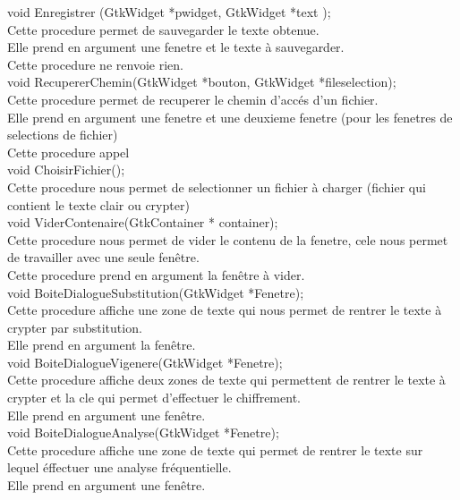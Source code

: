 \documentclass[a4]{article}
\begin{document}
	void Enregistrer (GtkWidget *pwidget, GtkWidget *text );\\
		Cette procedure permet de sauvegarder le texte obtenue.\\
		Elle prend en argument une fenetre et le texte à sauvegarder.\\
		Cette procedure ne renvoie rien.\\
	
	void RecupererChemin(GtkWidget *bouton, GtkWidget *fileselection);\\
		Cette procedure permet de recuperer le chemin d'accés d'un fichier.\\
		Elle prend en argument une fenetre et une deuxieme fenetre (pour les fenetres de selections de fichier)\\
		Cette procedure appel\\

	void ChoisirFichier();\\
		Cette procedure nous permet de selectionner un fichier à charger (fichier qui contient le texte clair ou crypter)\\

	void ViderContenaire(GtkContainer * container);\\
		Cette procedure nous permet de vider le contenu de la fenetre, cele nous permet de travailler avec une seule fenêtre.\\
		Cette procedure prend en argument la fenêtre à vider.\\
		
	void BoiteDialogueSubstitution(GtkWidget *Fenetre);\\
		Cette procedure affiche une zone de texte qui nous permet de rentrer le texte à crypter par substitution.\\
		Elle prend en argument la fenêtre.\\
	
	void BoiteDialogueVigenere(GtkWidget *Fenetre);\\
		Cette procedure affiche deux zones de texte qui permettent de rentrer le texte à crypter et la cle qui permet d'effectuer le chiffrement.\\
		Elle prend en argument une fenêtre.\\
		
	void BoiteDialogueAnalyse(GtkWidget *Fenetre);\\
		Cette procedure affiche une zone de texte qui permet de rentrer le texte sur lequel éffectuer une analyse fréquentielle.\\
		Elle prend en argument une fenêtre.\\
		
\end{document}

